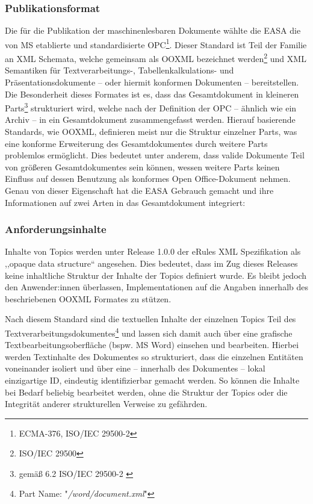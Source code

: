         
        \subsubsection{Publikationsformat}

    Die für die Publikation der maschinenlesbaren Dokumente wählte die \ac{EASA} die von \acf{MS} etablierte und standardisierte \acf{OPC}\footnote{\acs{ECMA}-376, ISO/IEC 29500-2}.
    Dieser Standard ist Teil der Familie an \ac{XML} Schemata, welche gemeinsam als \acf{OOXML} bezeichnet werden\footnote{ ISO/IEC 29500} und \ac{XML} Semantiken für Textverarbeitungs-, Tabellen\-kal\-ku\-lations- und Präsentationsdokumente -- oder hiermit konformen Dokumenten -- bereitstellen. 
    \cite[vii]{easa_opc_iso} 
    Die Besonderheit dieses Formates ist es, dass das Gesamtdokument in kleineren Parts\footnote{gemäß 6.2 ISO/IEC 29500-2 \cite{easa_opc_iso}} strukturiert wird, welche nach der Definition der \ac{OPC} -- ähnlich wie ein Archiv -- in ein Gesamtdokument zusammengefasst werden.
    Hierauf basierende Standards, wie \ac{OOXML}, definieren meist nur die Struktur einzelner Parts, was eine konforme Erweiterung des Gesamtdokumentes durch weitere Parts problemlos ermöglicht.   
    Dies bedeutet unter anderem, dass valide Dokumente Teil von größeren Gesamtdokumentes sein können, wessen weitere Parts keinen Einfluss auf dessen Benutzung als konformes Open Office-Dokument nehmen.
    Genau von dieser Eigenschaft hat die \ac{EASA} Gebrauch gemacht und ihre Informationen auf zwei Arten in das Gesamtdokument integriert:

            \subsubsection{Anforderungsinhalte}

    Inhalte von Topics werden unter Release 1.0.0 der eRules \ac{XML} Spezifikation als ,,opaque data structure`` angesehen.
    Dies bedeutet, dass im Zug dieses Releases keine inhaltliche Struktur der Inhalte der Topics definiert wurde.
    Es bleibt jedoch den Anwender:innen überlassen, Implementationen auf die Angaben innerhalb des beschriebenen \acs{OOXML} Formates zu stützen.
    \cite[6]{easa_xml_doc}

    Nach diesem Standard sind die textuellen Inhalte der einzelnen Topics Teil des Textverarbeitungsdokumentes\footnote{Part Name: "\textit{/word/document.xml}"} und lassen sich damit auch über eine grafische Textbearbeitungsoberfläche (bspw. \ac{MS} Word) einsehen und bearbeiten.
    Hierbei werden Textinhalte des Dokumentes so strukturiert, dass die einzelnen Entitäten voneinander isoliert und über eine -- innerhalb des Dokumentes -- lokal einzigartige ID, eindeutig identifizierbar gemacht werden.
    So können die Inhalte bei Bedarf beliebig bearbeitet werden, ohne die Struktur der Topics oder die Integrität anderer strukturellen Verweise zu gefährden.

